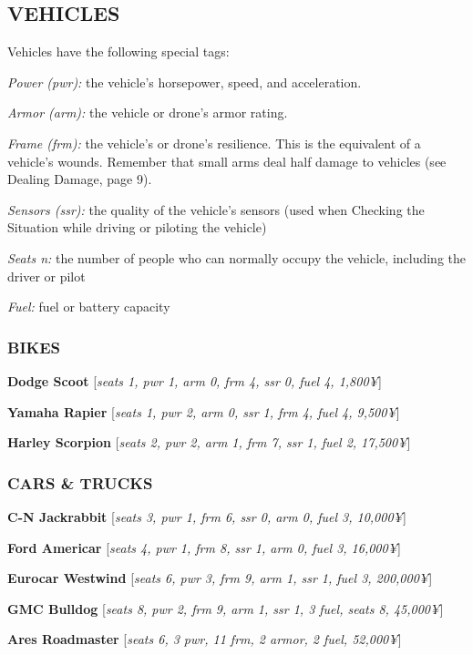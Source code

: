 \documentclass[oneside,10pt]{article}
\begin{document}
\begin{multicols}{2}
  \subsection{VEHICLES}
  Vehicles have the following special tags:

  \begin{dent}
    \textit{Power (pwr):} the vehicle’s horsepower, speed, and
    acceleration.

    \textit{Armor (arm):} the vehicle or drone’s armor rating.

    \textit{Frame (frm):} the vehicle’s or drone’s resilience. This is
    the equivalent of a vehicle’s wounds. Remember that small arms
    deal half damage to vehicles (see Dealing Damage, page 9).

    \textit{Sensors (ssr):} the quality of the vehicle’s sensors (used
    when Checking the Situation while driving or piloting the vehicle)

    \textit{Seats n:} the number of people who can normally occupy the
    vehicle, including the driver or pilot

    \textit{Fuel:} fuel or battery capacity
  \end{dent}

  \subsubsection{BIKES}
  \textbf{Dodge Scoot} [\textit{seats 1, pwr 1, arm 0, frm 4, ssr 0,
    fuel 4, 1,800¥}]

  \textbf{Yamaha Rapier} [\textit{seats 1, pwr 2, arm 0, ssr 1, frm 4,
    fuel 4, 9,500¥}]

  \textbf{Harley Scorpion} [\textit{seats 2, pwr 2, arm 1, frm 7, ssr
    1, fuel 2, 17,500¥}]


  \subsubsection{CARS \& TRUCKS}
  \textbf{C-N Jackrabbit} [\textit{seats 3, pwr 1, frm 6, ssr 0, arm
    0, fuel 3, 10,000¥}]

  \textbf{Ford Americar} [\textit{seats 4, pwr 1, frm 8, ssr 1, arm 0,
    fuel 3, 16,000¥}]

  \textbf{Eurocar Westwind} [\textit{seats 6, pwr 3, frm 9, arm 1, ssr
    1, fuel 3, 200,000¥}]

  \textbf{GMC Bulldog} [\textit{seats 8, pwr 2, frm 9, arm 1, ssr 1, 3
    fuel, seats 8, 45,000¥}]

  \textbf{Ares Roadmaster} [\textit{seats 6, 3 pwr, 11 frm, 2 armor, 2
    fuel, 52,000¥}]



\end{multicols}
\end{document}
